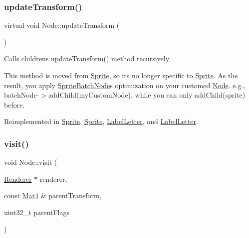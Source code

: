 \subsubsection{\texorpdfstring{update\+Transform()}{updateTransform()}\hspace{0.1cm}{\footnotesize\ttfamily [2/2]}}
{\footnotesize\ttfamily virtual void Node\+::update\+Transform (\begin{DoxyParamCaption}{ }\end{DoxyParamCaption})\hspace{0.3cm}{\ttfamily [virtual]}}

Calls children\textquotesingle{}s \hyperlink{classNode_a8583decfa6069f06ec1e9f8080c1ae36}{update\+Transform()} method recursively.

This method is moved from \hyperlink{classSprite}{Sprite}, so it\textquotesingle{}s no longer specific to \hyperlink{classSprite}{Sprite}. As the result, you apply \hyperlink{classSpriteBatchNode}{Sprite\+Batch\+Node}\textquotesingle{}s optimization on your customed \hyperlink{classNode}{Node}. e.\+g., {\ttfamily batch\+Node-\/$>$add\+Child(my\+Custom\+Node)}, while you can only add\+Child(sprite) before. 

Reimplemented in \hyperlink{classSprite_aa486a133eeb98d0872f4a71e5926aeeb}{Sprite}, \hyperlink{classSprite_a6b64d23ba646325021c2a5118dc5163d}{Sprite}, \hyperlink{classLabelLetter_ae52821b1e8fb7782602524f23c23b3ac}{Label\+Letter}, and \hyperlink{classLabelLetter_ae52821b1e8fb7782602524f23c23b3ac}{Label\+Letter}.

\mbox{\label{classNode_a7d794a5e30745611ec33881a625edf26}} 
\subsubsection{\texorpdfstring{visit()}{visit()}\hspace{0.1cm}{\footnotesize\ttfamily [1/2]}}
{\footnotesize\ttfamily void Node\+::visit (\begin{DoxyParamCaption}\item[{\hyperlink{classRenderer}{Renderer} $\ast$}]{renderer,  }\item[{const \hyperlink{classMat4}{Mat4} \&}]{parent\+Transform,  }\item[{uint32\+\_\+t}]{parent\+Flags }\end{DoxyParamCaption})\hspace{0.3cm}{\ttfamily [virtual]}}

